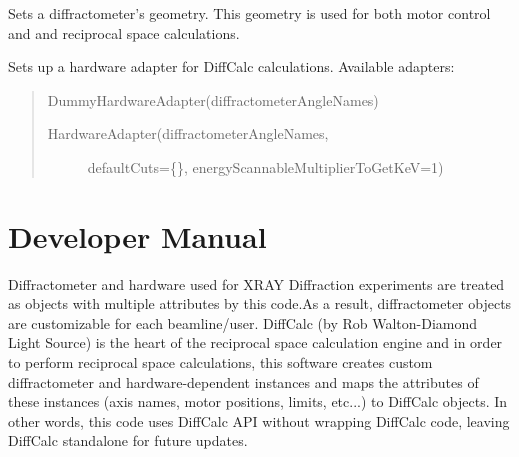 \documentclass[letterpaper,10pt,english]{sphinxmanual}
\begin{document}
\begin{fulllineitems}
\begin{fulllineitems}
\end{fulllineitems}


\begin{fulllineitems}
\label{Manual:Diffractometer.Diffractometer.setGeometry}
Sets a diffractometer's geometry. This geometry is used for both motor control and
and reciprocal space calculations.

\end{fulllineitems}


\begin{fulllineitems}
\label{Manual:Diffractometer.Diffractometer.setHardwareAdapter}
Sets up a hardware adapter for DiffCalc calculations.
Available adapters:
\begin{quote}

DummyHardwareAdapter(diffractometerAngleNames)
\begin{description}
\item[{HardwareAdapter(diffractometerAngleNames, }] \leavevmode
defaultCuts=\{\}, 
energyScannableMultiplierToGetKeV=1)

\end{description}
\end{quote}

\end{fulllineitems}


\end{fulllineitems}



\chapter{Developer Manual}
\label{Developer Manual:developer-manual}\label{Developer Manual::doc}\label{Developer Manual:module-Diffractometer}
Diffractometer and hardware used for XRAY Diffraction experiments are treated as objects with multiple attributes by this code.As a result, diffractometer objects are customizable for each beamline/user. DiffCalc (by Rob Walton-Diamond Light Source) is the heart of the reciprocal space calculation engine and in order to perform reciprocal space calculations, this software creates custom diffractometer and hardware-dependent instances and maps the attributes of these instances (axis names, motor positions, limits, etc...) to DiffCalc objects. In other words, this code uses DiffCalc API without wrapping DiffCalc code, leaving DiffCalc standalone for future updates.
\end{document}
